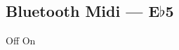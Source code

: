 \subsection[Bluetooth Midi]{Bluetooth Midi --- \UiKey{\SET}E$\flat$5}









































Off
On

